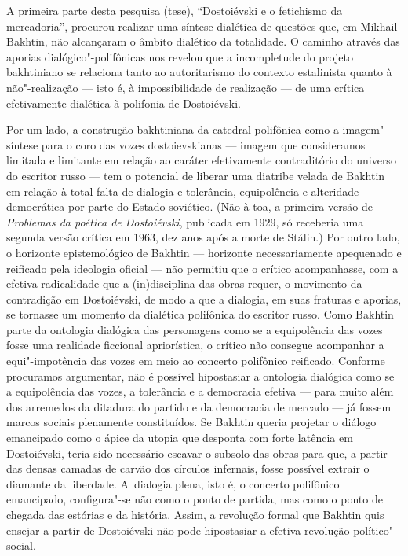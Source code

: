 A primeira parte desta pesquisa (tese), ``Dostoiévski e o fetichismo da
mercadoria'', procurou realizar uma síntese dialética de questões que,
em Mikhail Bakhtin, não alcançaram o âmbito dialético da totalidade. O
caminho através das aporias dialógico"-polifônicas nos revelou que a
incompletude do projeto bakhtiniano se relaciona tanto ao autoritarismo
do contexto estalinista quanto à não"-realização --- isto é, à
impossibilidade de realização --- de uma crítica efetivamente dialética à
polifonia de Dostoiévski.

Por um lado, a construção bakhtiniana da catedral polifônica como a
imagem"-síntese para o coro das vozes dostoievskianas --- imagem que
consideramos limitada e limitante em relação ao caráter efetivamente
contraditório do universo do escritor russo --- tem o potencial de
liberar uma diatribe velada de Bakhtin em relação à total falta de
dialogia e tolerância, equipolência e alteridade democrática por parte
do Estado soviético. (Não à toa, a primeira versão de \emph{Problemas da
poética de Dostoiévski}, publicada em 1929, só receberia uma segunda
versão crítica em 1963, dez anos após a morte de Stálin.) Por outro
lado, o horizonte epistemológico de Bakhtin --- horizonte necessariamente
apequenado e reificado pela ideologia oficial --- não permitiu que o
crítico acompanhasse, com a efetiva radicalidade que a (in)disciplina
das obras requer, o movimento da contradição em Dostoiévski, de modo a
que a dialogia, em suas fraturas e aporias, se tornasse um momento da
dialética polifônica do escritor russo. Como Bakhtin parte da ontologia
dialógica das personagens como se a equipolência das vozes fosse uma
realidade ficcional apriorística, o crítico não consegue acompanhar a
equi"-impotência das vozes em meio ao concerto polifônico reificado.
Conforme procuramos argumentar, não é possível hipostasiar a ontologia
dialógica como se a equipolência das vozes, a tolerância e a democracia
efetiva --- para muito além dos arremedos da ditadura do partido e da
democracia de mercado --- já fossem marcos sociais plenamente
constituídos. Se Bakhtin queria projetar o diálogo emancipado como o
ápice da utopia que desponta com forte latência em Dostoiévski, teria
sido necessário escavar o subsolo das obras para que, a partir das
densas camadas de carvão dos círculos infernais, fosse possível extrair
o diamante da liberdade. A~dialogia plena, isto é, o concerto polifônico
emancipado, configura"-se não como o ponto de partida, mas como o ponto
de chegada das estórias e da história. Assim, a revolução formal que
Bakhtin quis ensejar a partir de Dostoiévski não pode hipostasiar a
efetiva revolução político"-social.

